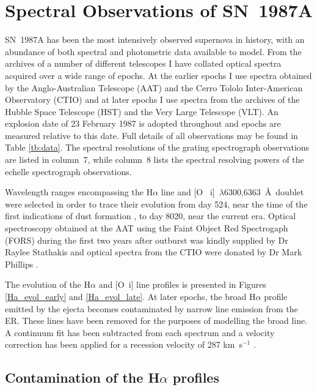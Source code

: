 \section{Spectral Observations of SN~1987A}
\label{spectra}


SN~1987A has been the most intensively observed supernova in history, with 
an abundance of both spectral and photometric data available to model.  From 
the archives of a number of different telescopes I have collated optical 
spectra acquired over a wide range of epochs.  At the earlier epochs I 
use spectra obtained by the Anglo-Australian Telescope (AAT) and the Cerro 
Tololo Inter-American Observatory (CTIO) and at later epochs I 
use spectra from the archives of the Hubble Space Telescope (HST) and the Very 
Large Telescope (VLT).  An explosion date of 23 February 1987 is adopted 
throughout and epochs are measured relative to this date.  Full details of 
all observations may be found in Table \ref{tb:data}. The spectral 
resolutions of the grating spectrograph observations are listed in 
column~7, while column~8 lists the spectral resolving powers of the 
echelle spectrograph observations.


Wavelength ranges encompassing the H$\alpha$ line and [O~{\sc 
i}]~$\lambda$6300,6363~\AA\ doublet were selected in order to trace their 
evolution from day 524, near the time of the first indications of dust 
formation \citep{Wooden1993}, to day 8020, near the current era. Optical 
spectroscopy obtained at the AAT using the Faint Object Red Spectrogaph 
(FORS) during the first two years after outburst was kindly supplied by Dr 
Raylee Stathakis \citep{Spyromilio1991, Spyromilio1993, Hanuschik1993} and 
optical spectra from the CTIO were donated by Dr Mark Phillips 
\citep{Suntzeff1991}.

The evolution of the H$\alpha$ and [O~{\sc i}] line profiles is presented 
in Figures \ref{Ha_evol_early} and \ref{Ha_evol_late}.  At later epochs, 
the broad H$\alpha$ profile emitted by the ejecta becomes contaminated by 
narrow line emission from the ER.  These lines have been 
removed for the purposes of modelling the broad line. A continuum fit has 
been subtracted from each spectrum and a velocity correction has been 
applied for a recession velocity of 287 km~s$^{-1}$ 
\citep{Groningsson2008}.




\subsection{Contamination of the H$\alpha$ profiles}

